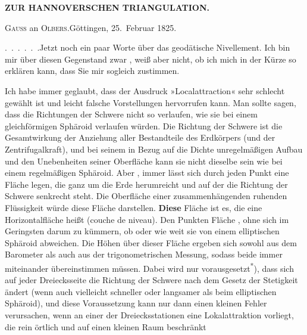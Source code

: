 \noindent\null\hfill{\small\textbf{ZUR HANNOVERSCHEN TRIANGULATION.}}\hfill{}\par\medskip

\begin{center}
\textsc{Gauss} an \textsc{Olbers}.\quad Göttingen, 25.~Februar 1825.
\end{center}

\par\noindent\hspace*{\parindent}\mbox{.\ .\ .\ .\ .\ .}\quad Jetzt noch ein paar Worte über das geodätische Nivellement.
Ich bin mir über diesen Gegenstand zwar , weiß aber nicht, ob ich mich in der Kürze so erklären kann, dass Sie mir sogleich zustimmen.

\par\noindent\hspace*{\parindent}Ich habe immer geglaubt, dass der Ausdruck »Localattraction« sehr schlecht gewählt ist und leicht falsche Vorstellungen hervorrufen kann.
Man sollte sagen, dass die Richtungen der Schwere nicht so verlaufen, wie sie bei einem gleichförmigen Sphäroid verlaufen würden.
Die Richtung der Schwere ist die Gesamtwirkung der Anziehung aller Bestandteile des Erdkörpers (und der Zentrifugalkraft), und bei seinem in Bezug auf die Dichte unregelmäßigen Aufbau und den Unebenheiten seiner Oberfläche kann sie nicht dieselbe sein wie bei einem regelmäßigen Sphäroid.
Aber , immer lässt sich durch jeden Punkt eine Fläche legen, die ganz um die Erde herumreicht und auf der die Richtung der Schwere  senkrecht steht. Die Oberfläche einer zusammenhängenden ruhenden Flüssigkeit würde diese Fläche darstellen.
\textbf{Diese} Fläche ist es, die eine Horizontalfläche heißt (couche de niveau). Den Punkten  Fläche , ohne sich im Geringsten darum zu kümmern, ob oder wie weit sie von einem elliptischen Sphäroid abweichen. Die Höhen über dieser Fläche ergeben sich sowohl aus dem Barometer als auch aus der trigonometrischen Messung, sodass beide immer miteinander übereinstimmen müssen.
Dabei wird nur vorausgesetzt\textsuperscript{*}), dass sich auf jeder Dreiecksseite die Richtung der Schwere nach dem Gesetz der Stetigkeit ändert (wenn auch vielleicht schneller oder langsamer als beim elliptischen Sphäroid), und diese Voraussetzung kann nur dann einen kleinen Fehler verursachen, wenn an einer der Dreiecksstationen eine  Lokalattraktion vorliegt, die rein örtlich und auf einen kleinen Raum beschränkt

